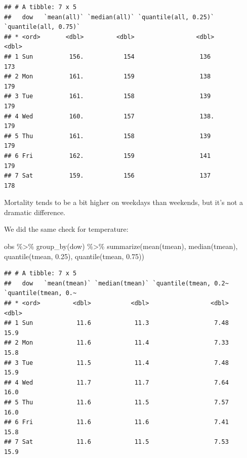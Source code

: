 \documentclass[
]{book}
\newenvironment{Shaded}{\begin{snugshade}}{\end{snugshade}}
\newcommand{\FloatTok}[1]{\textcolor[rgb]{0.00,0.00,0.81}{#1}}
\newcommand{\FunctionTok}[1]{\textcolor[rgb]{0.00,0.00,0.00}{#1}}
\newcommand{\NormalTok}[1]{#1}
\newcommand{\SpecialCharTok}[1]{\textcolor[rgb]{0.00,0.00,0.00}{#1}}
\begin{document}
\begin{verbatim}
## # A tibble: 7 x 5
##   dow   `mean(all)` `median(all)` `quantile(all, 0.25)` `quantile(all, 0.75)`
## * <ord>       <dbl>         <dbl>                 <dbl>                 <dbl>
## 1 Sun          156.           154                  136                    173
## 2 Mon          161.           159                  138                    179
## 3 Tue          161.           158                  139                    179
## 4 Wed          160.           157                  138.                   179
## 5 Thu          161.           158                  139                    179
## 6 Fri          162.           159                  141                    179
## 7 Sat          159.           156                  137                    178
\end{verbatim}

Mortality tends to be a bit higher on weekdays than weekends, but it's not
a dramatic difference.

We did the same check for temperature:

\begin{Shaded}
\begin{Highlighting}[]
\NormalTok{obs }\SpecialCharTok{\%\textgreater{}\%} 
  \FunctionTok{group\_by}\NormalTok{(dow) }\SpecialCharTok{\%\textgreater{}\%} 
  \FunctionTok{summarize}\NormalTok{(}\FunctionTok{mean}\NormalTok{(tmean), }
            \FunctionTok{median}\NormalTok{(tmean), }
            \FunctionTok{quantile}\NormalTok{(tmean, }\FloatTok{0.25}\NormalTok{), }
            \FunctionTok{quantile}\NormalTok{(tmean, }\FloatTok{0.75}\NormalTok{))}
\end{Highlighting}
\end{Shaded}

\begin{verbatim}
## # A tibble: 7 x 5
##   dow   `mean(tmean)` `median(tmean)` `quantile(tmean, 0.2~ `quantile(tmean, 0.~
## * <ord>         <dbl>           <dbl>                 <dbl>                <dbl>
## 1 Sun            11.6            11.3                  7.48                 15.9
## 2 Mon            11.6            11.4                  7.33                 15.8
## 3 Tue            11.5            11.4                  7.48                 15.9
## 4 Wed            11.7            11.7                  7.64                 16.0
## 5 Thu            11.6            11.5                  7.57                 16.0
## 6 Fri            11.6            11.6                  7.41                 15.8
## 7 Sat            11.6            11.5                  7.53                 15.9
\end{verbatim}
\end{document}
